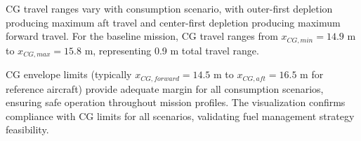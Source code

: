 CG travel ranges vary with consumption scenario, with outer-first depletion producing maximum aft travel and center-first depletion producing maximum forward travel. For the baseline mission, CG travel ranges from $x_{CG,min} = 14.9$ m to $x_{CG,max} = 15.8$ m, representing 0.9 m total travel range.

CG envelope limits (typically $x_{CG,forward} = 14.5$ m to $x_{CG,aft} = 16.5$ m for reference aircraft) provide adequate margin for all consumption scenarios, ensuring safe operation throughout mission profiles. The visualization confirms compliance with CG limits for all scenarios, validating fuel management strategy feasibility.